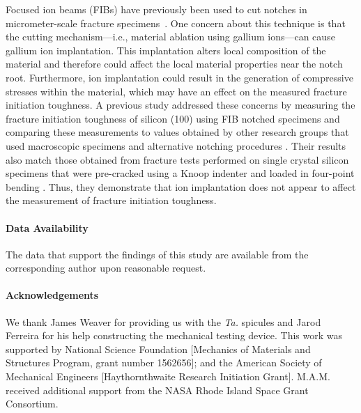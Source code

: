 \documentclass[12pt,onecolumn]{article}
\makeatletter
\newcommand{\TA}{\textit{Ta.\@}\xspace}
\makeatother
\begin{document}
Focused ion beams (FIBs) have previously been used to cut notches in micrometer-scale fracture specimens~\cite{jaya2015can,fett2008fracture,ochiai2014fracture,morishita2006fracture}.  One concern about this technique is that the cutting mechanism---i.e., material ablation using gallium ions---can cause gallium ion implantation. This implantation alters local composition of the material and therefore could affect the local material properties near the notch root. Furthermore, ion implantation could result in the generation of compressive stresses within the material, which may have an effect on the measured fracture initiation toughness. A previous study \cite{jaya2015can} addressed these concerns by measuring the fracture initiation toughness of silicon (100) using FIB notched specimens and comparing these measurements to values obtained by other research groups that used macroscopic specimens and alternative notching procedures \cite{ritchie2003failure}. Their results also match those obtained from fracture tests performed on single crystal silicon specimens that were pre-cracked using a Knoop indenter and loaded in four-point bending \cite{chen1980fracture}. Thus, they demonstrate that ion implantation does not appear to affect the measurement of fracture initiation toughness.

\singlespacing

\paragraph{Data Availability}

The data that support the findings of this study are available from the corresponding author upon reasonable request.



\paragraph{Acknowledgements} %

We thank James Weaver for providing us with the \TA spicules and Jarod Ferreira for his help constructing the mechanical testing device. This work was supported by National Science Foundation [Mechanics of Materials and Structures Program, grant number 1562656]; and the American Society of Mechanical Engineers [Haythornthwaite Research Initiation Grant]. M.A.M. received additional support from the NASA Rhode Island Space Grant Consortium.
\end{document}
